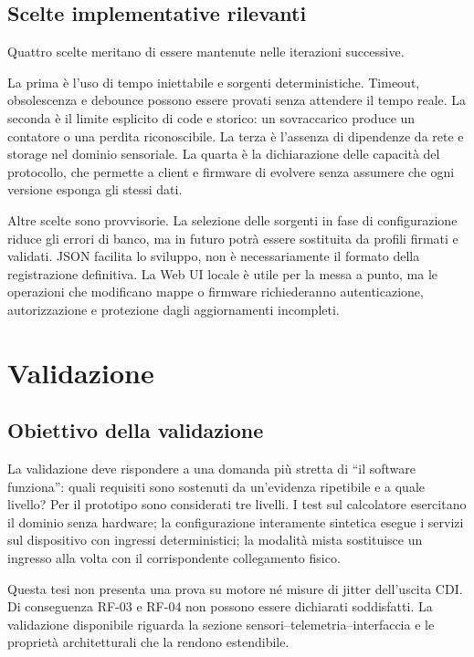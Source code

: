 \documentclass{article}
\begin{document}
\subsection{Scelte implementative rilevanti}

Quattro scelte meritano di essere mantenute nelle iterazioni successive.

La prima è l'uso di tempo iniettabile e sorgenti deterministiche. Timeout,
obsolescenza e debounce possono essere provati senza attendere il tempo reale.
La seconda è il limite esplicito di code e storico: un sovraccarico produce un
contatore o una perdita riconoscibile. La terza è l'assenza di dipendenze da
rete e storage nel dominio sensoriale. La quarta è la dichiarazione delle
capacità del protocollo, che permette a client e firmware di evolvere senza
assumere che ogni versione esponga gli stessi dati.

Altre scelte sono provvisorie. La selezione delle sorgenti in fase di
configurazione riduce gli errori di banco, ma in futuro potrà essere sostituita
da profili firmati e validati. JSON facilita lo sviluppo, non è necessariamente
il formato della registrazione definitiva. La Web UI locale è utile per la
messa a punto, ma le operazioni che modificano mappe o firmware richiederanno
autenticazione, autorizzazione e protezione dagli aggiornamenti incompleti.

\section{Validazione}
\label{sec:validazione}

\subsection{Obiettivo della validazione}

La validazione deve rispondere a una domanda più stretta di ``il software
funziona'': quali requisiti sono sostenuti da un'evidenza ripetibile e a quale
livello? Per il prototipo sono considerati tre livelli. I test sul calcolatore
esercitano il dominio senza hardware; la configurazione interamente sintetica
esegue i servizi sul dispositivo con ingressi deterministici; la modalità mista
sostituisce un ingresso alla
volta con il corrispondente collegamento fisico.

Questa tesi non presenta una prova su motore né misure di jitter dell'uscita CDI.
Di conseguenza RF-03 e RF-04 non possono essere dichiarati soddisfatti. La
validazione disponibile riguarda la sezione sensori--telemetria--interfaccia e
le proprietà architetturali che la rendono estendibile.
\end{document}

